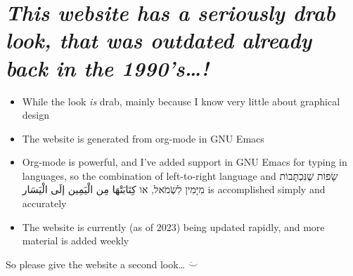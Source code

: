 \documentclass[11pt]{article}
\begin{document}
\section{\emph{This website has a seriously drab look, that was outdated already back in the 1990's\ldots{}!}}
\label{sec:org9d2269f}

\begin{itemize}
\item While the look \emph{is} drab, mainly because I know very little about graphical design
\item The website is generated from org-mode in GNU Emacs
\item Org-mode is powerful, and I've added support in GNU Emacs for typing in languages, so the combination of left-to-right language and שָׂפוֹת שֶׁנִּכְתָּבוֹת מִיָּמִין לִשְׂמֹאל, או كِتَابَتْهَا مِن الْيَمِين إلَى الْيَسَار is accomplished simply and accurately
\item The website is currently (as of 2023) being updated rapidly, and more material is added weekly
\end{itemize}

So please give the website a second look\ldots{} \(\ddot\smile\)
\end{document}

